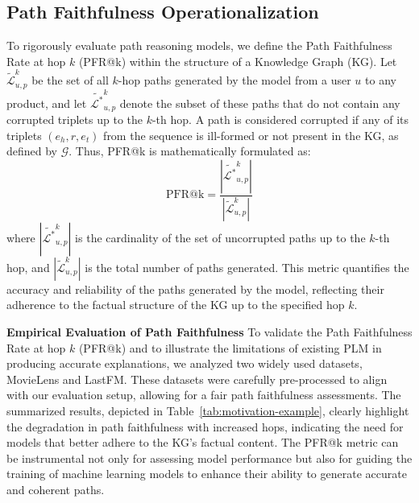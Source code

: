 \documentclass[sigconf]{acmart}
\begin{document}
\subsection{Path Faithfulness Operationalization}
\label{subsec:measuring-faithfulness}
To rigorously evaluate path reasoning models, we define the Path Faithfulness Rate at hop \(k\) (PFR@k) within the structure of a Knowledge Graph (KG). Let \(\mathcal{\tilde{L}}^k_{u,p}\) be the set of all \(k\)-hop paths generated by the model from a user \(u\) to any product, and let $\mathcal{\tilde{L^*}}^k_{u,p}$ denote the subset of these paths that do not contain any corrupted triplets up to the \(k\)-th hop. A path is considered corrupted if any of its triplets \( (e_h, r, e_t) \) from the sequence is ill-formed or not present in the KG, as defined by \( \mathcal{G} \). Thus, PFR@k is mathematically formulated as:
\[
\text{PFR@k} = \frac{|\mathcal{\tilde{L^*}}^k_{u,p}|}{|\mathcal{\tilde{L}}^k_{u,p}|}
\]
where \(|\mathcal{\tilde{L^*}}^k_{u,p}|\) is the cardinality of the set of uncorrupted paths up to the \(k\)-th hop, and $|\mathcal{\tilde{L}}^k_{u,p}|$ is the total number of paths generated. This metric quantifies the accuracy and reliability of the paths generated by the model, reflecting their adherence to the factual structure of the KG up to the specified hop \(k\).



\begin{table}[!t]
\centering
\caption{PFR@k at various hop size for PLM \cite{10.1007/978-3-031-28241-6_1}}
\label{tab:motivation-example}
\end{table}

\vspace{1mm} \noindent \textbf{Empirical Evaluation of Path Faithfulness} To validate the Path Faithfulness Rate at hop \(k\) (PFR@k) and to illustrate the limitations of existing PLM \cite{10.1145/3485447.3511937} in producing accurate explanations, we analyzed two widely used datasets, MovieLens and LastFM. These datasets were carefully pre-processed to align with our evaluation setup, allowing for a fair path faithfulness assessments. The summarized results, depicted in Table~\ref{tab:motivation-example}, clearly highlight the degradation in path faithfulness with increased hops, indicating the need for models that better adhere to the KG's factual content. The PFR@k metric can be instrumental not only for assessing model performance but also for guiding the training of machine learning models to enhance their ability to generate accurate and coherent paths. 
\end{document}
